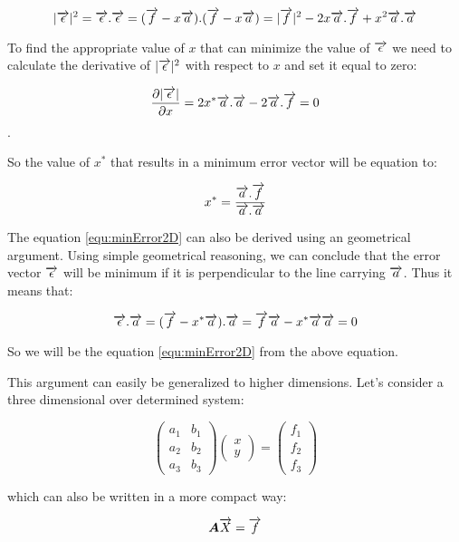 \[ |\overrightarrow{\epsilon}|^2 = \overrightarrow{\epsilon}.\overrightarrow{\epsilon} = (\overrightarrow{f} - x\overrightarrow{a}).(\overrightarrow{f} - x\overrightarrow{a}) = |\overrightarrow{f}|^2 - 2x\overrightarrow{a}.\overrightarrow{f} + x^2\overrightarrow{a}.\overrightarrow{a} \]

To find the appropriate value of $x$ that can minimize the value of $ \overrightarrow{\epsilon} $ we need to calculate the derivative of $ |\overrightarrow{\epsilon}|^2 $ with respect to $x$ and set it equal to zero:
	
\[ \frac{\partial |\overrightarrow{\epsilon}|}{\partial x} = 2x^* \overrightarrow{a} . \overrightarrow{a} - 2\overrightarrow{a}.\overrightarrow{f} = 0 \]. 

So the value of $x^*$ that results in a minimum error vector will be equation to:

\begin{equation}
	x^* = \frac{\overrightarrow{a} . \overrightarrow{f}}{\overrightarrow{a}. \overrightarrow{a}}
	\label{equ:minError2D}
\end{equation}

The equation \ref{equ:minError2D} can also be derived using an geometrical argument. Using simple geometrical reasoning, we can conclude that the error vector $\overrightarrow{\epsilon}$ will be minimum if it is perpendicular to the line carrying $\overrightarrow{a}$. Thus it means that:

\[ \overrightarrow{\epsilon} . \overrightarrow{a} = (\overrightarrow{f} - x^* \overrightarrow{a}) . \overrightarrow{a} = \overrightarrow{f}\overrightarrow{a} - x^* \overrightarrow{a} \overrightarrow{a} = 0 \] 

So we will be the equation \ref{equ:minError2D} from the above equation. 


This argument can easily be generalized to higher dimensions. Let's consider a three dimensional over determined system:


\begin{equation*}
	\begin{pmatrix}
		a_1 & b_1 \\
		a_2 & b_2 \\
		a_3 & b_3
	\end{pmatrix} 
	\begin{pmatrix}
		x \\
		y
	\end{pmatrix}
	= \begin{pmatrix}
		f_1 \\
		f_2 \\
		f_3
	\end{pmatrix}
\end{equation*}

which can also be written in a more compact way:

\begin{equation*}
	\boldsymbol{A} \overrightarrow{X} = \overrightarrow{f}
\end{equation*}




